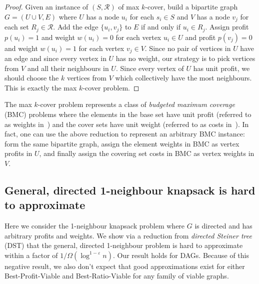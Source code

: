\documentclass[12pt]{article}
\newcommand{\BMC}{{BMC}\xspace}
\newcommand{\DST}{{DST}\xspace}
\begin{document}
\begin{proof}
Given an instance of $(S,{\mathcal R})$ of max $k$-cover, build a bipartite
graph $G=(U \cup V, E)$ where $U$ has a node $u_{i}$ for each $s_i \in
S$ and $V$ has a node $v_{j}$ for each set $R_{j} \in {\mathcal R}$.  Add
the edge $\{u_{i}, v_{j}\}$ to $E$ if and only if $u_{i} \in R_{j}$.
Assign profit $p(u_{i})=1$ and weight $w(u_{i})=0$ for each vertex
$u_{i} \in U$ and profit $p(v_{j})=0$ and weight $w(u_{i})=1$ for each
vertex $v_{j} \in V$.  Since no pair of vertices in $U$ have an edge
and since every vertex in $U$ has no weight, our strategy is to pick
vertices from $V$ and all their neighbours in $U$.  Since every
vertex of $U$ has unit profit, we should choose the $k$ vertices from
$V$ which collectively have the most neighbours.  This is exactly the
max $k$-cover problem.

\end{proof}

The max $k$-cover problem represents a class of {\em budgeted maximum
coverage} (\BMC) problems where the elements in the base set have
unit profit (referred to as weights in~\cite{kmn:ipl1999}) and the
cover sets have unit weight (referred to as costs
in~\cite{kmn:ipl1999}).  In fact, one can use the above reduction to
represent an arbitrary \BMC instance: form the same bipartite graph,
assign the element weights in \BMC as vertex profits in $U$, and finally
assign the covering set costs in \BMC as vertex weights in $V$.










\subsection{General, directed 1-neighbour knapsack is hard to approximate} \label{sec:gd1n}

Here we consider the 1-neighbour knapsack problem where $G$ is directed and has arbitrary profits and weights.  We show via a reduction from {\em directed Steiner tree} (\DST) that the general, directed 1-neighbour problem is hard to approximate within a factor of $1/ \Omega(\log^{1-\varepsilon} n)$.  Our result holds for DAGs.  Because of this negative result, we also don't expect that good approximations exist for either {\sc Best-Profit-Viable} and {\sc Best-Ratio-Viable} for any family of viable graphs.
\end{document}
